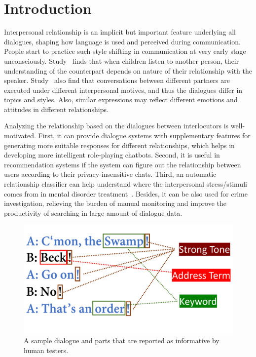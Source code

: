 \section{Introduction}

Interpersonal relationship is an implicit but important feature 
underlying all dialogues, shaping how language is used and perceived 
during communication. People start to practice such style shifting in 
communication at very early stage unconsciously. Study~\cite{mind-reading} 
finds that when children listen to another person, their understanding 
of the counterpart depends on nature of their relationship with the speaker. 
Study~\cite{conversational-motive} also find that conversations between 
different partners are executed under different interpersonal motives, 
and thus the dialogues differ in topics and styles. 
Also, similar expressions may reflect different emotions and attitudes in 
different relationships. 

Analyzing the relationship based on the dialogues between interlocutors 
is well-motivated. First, it can provide dialogue systems with 
supplementary features for generating more suitable responses for different 
relationships, which helps in developing more intelligent role-playing chatbots.
Second, it is useful in recommendation systems if the system can figure 
out the relationship between users according to their privacy-insensitive chats.
Third, an automatic relationship classifier can help 
understand where the interpersonal stress/stimuli comes from in 
mental disorder treatment~\cite{tension-monitor,bopolar-monitor,cog-load}.
Besides, it can be also used for crime investigation, relieving
the burden of manual monitoring and improve the productivity of searching
in large amount of dialogue data. 

\begin{figure}[t!]
	\centering
	\includegraphics[width=0.85\columnwidth]{instinct.pdf}
	\caption{A sample dialogue and parts that are 
		reported as informative by human testers. }
	\label{fig:instinct}
\end{figure}


